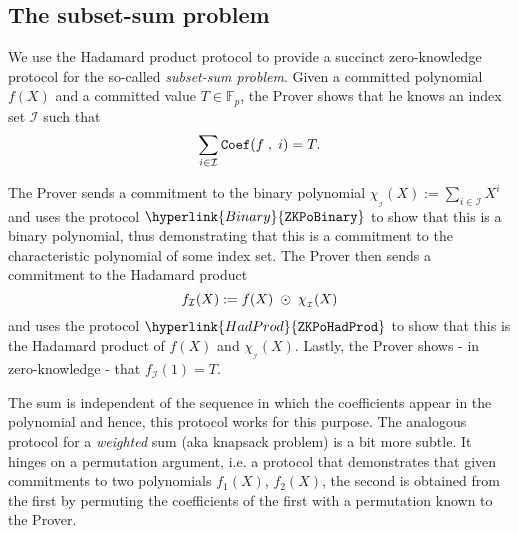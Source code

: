\documentclass[11pt, lettersize, notitlepage, leqno, footskip=0.6cm]{article}
\newcommand{\bFp}{\mathbb{F}_p}
\newcommand{\wti}{\widetilde}
\newcommand{\mc}{\mathcal}
\newcommand{\mP}{\mc{P}}
\newcommand{\V}{\mc{V}}
\newcommand{\vs}{\vspace{-0.15cm}}
\numberwithin{equation}{section}
\begin{document}
\begin{comment}
\item $\mP$ computes the polynomial \vs $$f^{\vee}_{\mc{I}}(X):= \sum\limits_{i\in \mc{I}} {\tt{Coef}}(f\;,\;i)^{-1}\cdot X^i    \vs $$ and sends the element \vs $$a^{\vee}:= g_1^{f^{\vee}(s)}\vs $$ along with a proof for $\hyperlink{HadProd}{\tt{ZKPoHadProd}}[g_1,\;(a,\;a^{\vee}),\;\wti{a}_{\tt{nz}}]$

\item The Verifier $\V$ verifies the $\hyperlink{Binary}{\tt{ZKPoBinary}}$, the $\hyperlink{HadProd}{\tt{ZKPoHadProd}}$s and accepts if and only if they are all valid. \qed \end{enumerate} \end{mdframed}





\bigskip


\end{comment}


\subsection{\fontsize{11}{11}\selectfont The subset-sum problem}

We use the Hadamard product protocol to provide a succinct zero-knowledge protocol for the so-called \textit{subset-sum problem}. Given a committed polynomial $f(X)$ and a committed value $T\in\bFp$, the Prover shows that he knows an index set $\mc{I}$ such that \vs $$ \sum\limits_{i\in\mc{I}} {\tt{Coef}}(f\;,\;i) = T.\vs $$ 

The Prover sends a commitment to the binary polynomial $\chi_{_{\mc{I}}}(X):= \sum_{i\in\mc{I}} X^i$ and uses the protocol $\hyperlink{Binary}{\tt{ZKPoBinary}}$ to show that this is a binary polynomial, thus demonstrating that this is a commitment to the characteristic polynomial of some index set. The Prover then sends a commitment to the Hadamard product \vs $$f_{\mc{I}}(X):= f(X)\;\odot\; \chi_{_{\mc{I}}}(X)\vs $$ and uses the protocol $\hyperlink{HadProd}{\tt{ZKPoHadProd}}$ to show that this is the Hadamard product of $f(X)$ and $\chi_{_{\mc{I}}}(X)$. Lastly, the Prover shows - in zero-knowledge - that $f_{\mc{I}}(1) = T$.

The sum is independent of the sequence in which the coefficients appear in the polynomial and hence, this protocol works for this purpose. The analogous protocol for a \textit{weighted} sum (aka knapsack problem) is a bit more subtle. It hinges on a permutation argument, i.e. a protocol that demonstrates that given commitments to two polynomials $f_1(X)$, $f_2(X)$, the second is obtained from the first by permuting the coefficients of the first with a permutation known to the Prover. 
\end{document}
